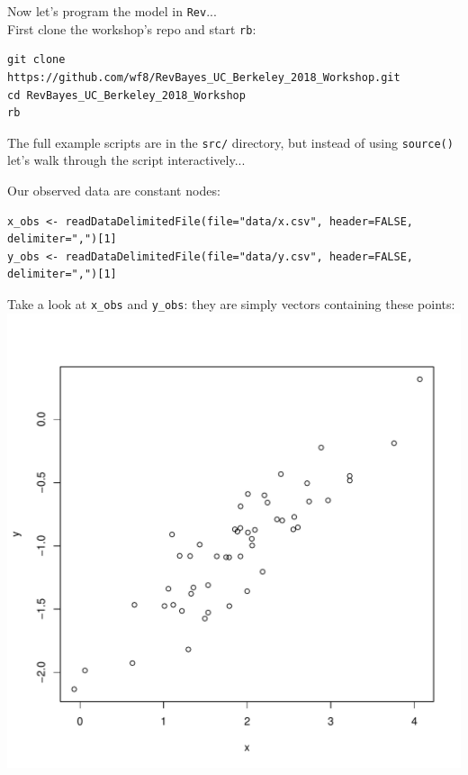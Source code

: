 \documentclass[mathserif]{beamer}
\begin{document}
\begin{frame}[fragile]
Now let's program the model in \texttt{Rev}...\\
    \bigskip
    First clone the workshop's repo and start \texttt{rb}:\\
    \bigskip
    \begin{lstlisting}
git clone https://github.com/wf8/RevBayes_UC_Berkeley_2018_Workshop.git
cd RevBayes_UC_Berkeley_2018_Workshop
rb
    \end{lstlisting}
\bigskip
    The full example scripts are in the \texttt{src/} directory, but instead of using \texttt{source()}
    let's walk through the script interactively...
\end{frame}

\begin{frame}[fragile]
    Our observed data are constant nodes:\\
    \bigskip
    \begin{lstlisting}
x_obs <- readDataDelimitedFile(file="data/x.csv", header=FALSE, delimiter=",")[1]
y_obs <- readDataDelimitedFile(file="data/y.csv", header=FALSE, delimiter=",")[1]
    \end{lstlisting}
\bigskip
    Take a look at \texttt{x\_obs} and \texttt{y\_obs}: they are simply vectors containing these points:\\
    \center
    \includegraphics[scale=0.2]{figures/linear_regression.pdf}\\
\end{frame}
\end{document}
